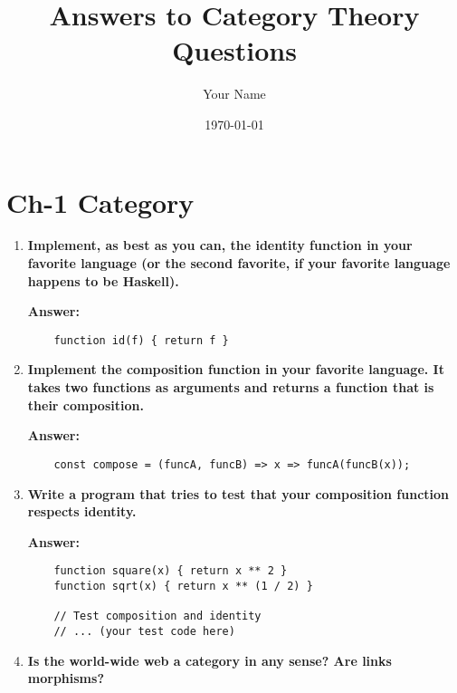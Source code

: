 \documentclass{article}
\begin{document}
\title{Answers to Category Theory Questions}
\author{Your Name}
\date{\today}
\maketitle

\section{Ch-1 Category}
\begin{enumerate}
	\item \textbf{Implement, as best as you can, the identity function in your favorite language (or the second favorite, if your favorite language happens to be Haskell).}

	      \textbf{Answer:}
	      \begin{verbatim}
    function id(f) { return f }
    \end{verbatim}

	\item \textbf{Implement the composition function in your favorite language. It takes two functions as arguments and returns a function that is their composition.}

	      \textbf{Answer:}
	      \begin{verbatim}
    const compose = (funcA, funcB) => x => funcA(funcB(x));
    \end{verbatim}

	\item \textbf{Write a program that tries to test that your composition function respects identity.}

	      \textbf{Answer:}
	      \begin{verbatim}
    function square(x) { return x ** 2 }
    function sqrt(x) { return x ** (1 / 2) }

    // Test composition and identity
    // ... (your test code here)
    \end{verbatim}

	\item \textbf{Is the world-wide web a category in any sense? Are links morphisms?}


\end{enumerate}
\end{document}
